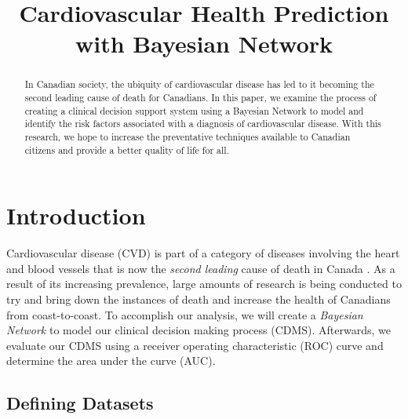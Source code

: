 \documentclass[conference]{IEEEtran}
\begin{document}
\title{Cardiovascular Health Prediction with Bayesian Network}


\author{
}

\maketitle

\begin{abstract}
In Canadian society, the ubiquity of cardiovascular disease has led to it becoming the second leading cause of death for Canadians. In this paper, we examine the process of creating a clinical decision support system using a Bayesian Network to model and identify the risk factors associated with a diagnosis of cardiovascular disease. With this research, we hope to increase the preventative techniques available to Canadian citizens and provide a better quality of life for all.
\end{abstract}

\IEEEpeerreviewmaketitle

\section{Introduction}
Cardiovascular disease (CVD) is part of a category of diseases involving the heart and blood vessels that is now the \textit{second leading} cause of death in Canada \cite{StatsCan}. As a result of its increasing prevalence, large amounts of research is being conducted to try and bring down the instances of death and increase the health of Canadians from coast-to-coast. To accomplish our analysis, we will create a \textit{Bayesian Network} to model our clinical decision making process (CDMS). Afterwards, we evaluate our CDMS using a receiver operating characteristic (ROC) curve and determine the area under the curve (AUC).  
\subsection{Defining Datasets}
\end{document}
